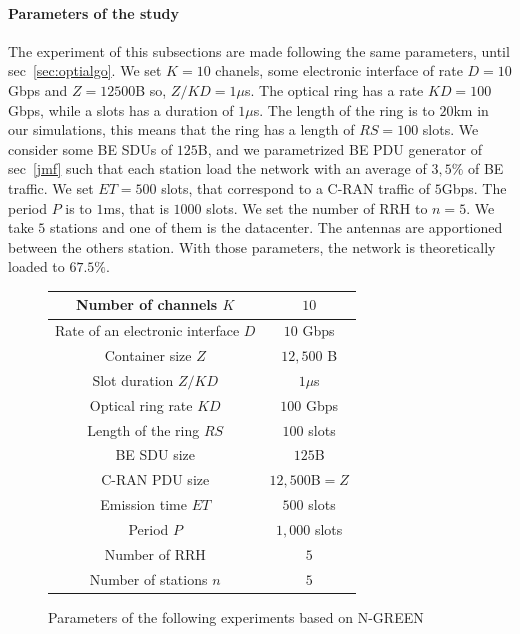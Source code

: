 \documentclass[a4paper,10pt,english]{article}
\begin{document}
  \paragraph{Parameters of the study}
  \label{sec:parameters} The experiment of this subsections are made following the same parameters, until sec~\ref{sec:optialgo}. We set $K = 10$ chanels, some electronic interface of rate $D=10$Gbps and $Z = 12500$B so, $Z/KD = 1\mu$s. The optical ring has a rate $KD=100$Gbps, while a slots has a duration of $1\mu$s. The length of the ring is to $20$km in our simulations, this means that the ring has a length of $RS = 100$ slots. We consider some BE SDUs of $125$B, and we parametrized BE PDU generator of sec~\ref{jmf} such that each station load the network with an average of $3,5\%$ of BE traffic. We set $ET = 500$ slots, that correspond to a C-RAN traffic of $5$Gbps. The period  $P$ is to $1$ms, that is $1000$ slots. We set the number of RRH to $n=5$. We take $5$ stations and one of them is the datacenter. The antennas are apportioned between the others station. With those parameters, the network is theoretically loaded to $67.5\%$. 
  
  \begin{figure}
  \centering
  \begin{tabular}{|c|c|}
  \hline
 Number of channels $K$ & $10$  \tabularnewline
  \hline
  Rate of an electronic interface $D$ & $10$ Gbps \tabularnewline
  \hline
  Container size  $Z$ & $12,500$ B  \tabularnewline
  \hline
  Slot duration $Z/KD$ & $1\mu$s \tabularnewline
  \hline
  Optical ring rate $KD$ & $100$ Gbps \tabularnewline
  \hline
  Length of the ring $RS$ & $100$ slots \tabularnewline
  \hline
  BE SDU size & $125$B \tabularnewline
  \hline
  C-RAN PDU size & $12,500$B$=Z$ \tabularnewline
  \hline
  Emission time $ET$ & $500$ slots \tabularnewline
  \hline
   Period $P$ & $1,000$ slots \tabularnewline
  \hline
  Number of RRH & $5$  \tabularnewline
  \hline
  Number of stations $n$ & $5$  \tabularnewline
  \hline
  
  \end{tabular}
  \caption{Parameters of the following experiments based on N-GREEN}\label{parameters}
  \end{figure}
  
\end{document}
